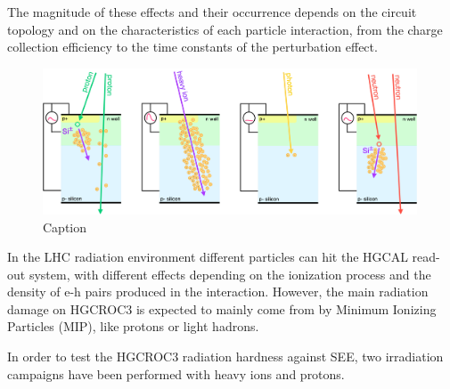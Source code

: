 The magnitude of these effects and their occurrence depends on the circuit topology and on the characteristics of each particle interaction, from the charge collection efficiency to the time constants of the perturbation effect. 

\bigbreak

\begin{figure} [b]
    \centering
    \includegraphics[width=0.99\textwidth]{Figures/HGCAL/SEE_ParticleInteraction.pdf}
    \caption{Caption}
    \label{fig:SEE_ParticleInteraction}
\end{figure}

In the LHC radiation environment different particles can hit the HGCAL read-out system, with different effects depending on the ionization process and the density of e-h pairs produced in the interaction. 
However, the main radiation damage on HGCROC3 is expected to mainly come from by Minimum Ionizing Particles (MIP), like protons or light hadrons. 

In order to test the HGCROC3 radiation hardness against SEE, two irradiation campaigns have been performed with heavy ions and protons. 


